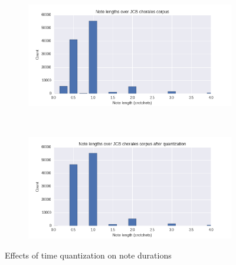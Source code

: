 \documentclass[dissertation.tex]{subfiles}
\begin{document}
\begin{figure}[htpb]
    \centering
    \begin{subfigure}[t]{0.48\textwidth}
        \centering
        \includegraphics[width=1.0\linewidth]{Figures/note-lengths-original.png}
    \end{subfigure}
    ~
    \begin{subfigure}[t]{0.48\textwidth}
        \centering
        \includegraphics[width=1.0\linewidth]{Figures/note-lengths-quantized.png}
    \end{subfigure}
    \caption{Effects of time quantization on note durations}
    \label{fig:note-lengths-time-quantization}
\end{figure}
\end{document}
